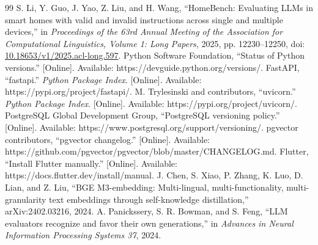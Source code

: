 \documentclass[conference]{IEEEtran}
\begin{document}
\begin{thebibliography}{99}
S. Li, Y. Guo, J. Yao, Z. Liu, and H. Wang, ``HomeBench: Evaluating LLMs in smart homes with valid and invalid instructions across single and multiple devices,'' in \emph{Proceedings of the 63rd Annual Meeting of the Association for Computational Linguistics, Volume 1: Long Papers}, 2025, pp. 12230--12250, doi: \href{https://doi.org/10.18653/v1/2025.acl-long.597}{10.18653/v1/2025.acl-long.597}.
Python Software Foundation, ``Status of Python versions.'' [Online]. Available: https://devguide.python.org/versions/.
FastAPI, ``fastapi.'' \emph{Python Package Index}. [Online]. Available: https://pypi.org/project/fastapi/.
M. Trylesinski and contributors, ``uvicorn.'' \emph{Python Package Index}. [Online]. Available: https://pypi.org/project/uvicorn/.
PostgreSQL Global Development Group, ``PostgreSQL versioning policy.'' [Online]. Available: https://www.postgresql.org/support/versioning/.
pgvector contributors, ``pgvector changelog.'' [Online]. Available: https://github.com/pgvector/pgvector/blob/master/CHANGELOG.md.
Flutter, ``Install Flutter manually.'' [Online]. Available: https://docs.flutter.dev/install/manual.
J. Chen, S. Xiao, P. Zhang, K. Luo, D. Lian, and Z. Liu, ``BGE M3-embedding: Multi-lingual, multi-functionality, multi-granularity text embeddings through self-knowledge distillation,'' arXiv:2402.03216, 2024.
A. Panickssery, S. R. Bowman, and S. Feng, ``LLM evaluators recognize and favor their own generations,'' in \emph{Advances in Neural Information Processing Systems 37}, 2024.
\end{thebibliography}
\end{document}
